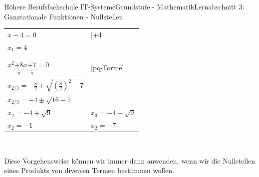 \documentclass[11pt,twocolumn,oneside,openany,headings=optiontotoc,11pt,numbers=noenddot]{article}
\begin{document}
\begin{worksheet}{Höhere Berufsfachschule IT-Systeme}{Grundstufe - Mathematik}{Lernabschnitt 3: Ganzrationale Funktionen - Nullstellen}
\begin{tabularx}{0.48\textwidth}{Xl}
			\(x-4 = 0\) & |+4\\
			\colorbox{green!10}{\(x_1 = 4\)} &\\
			\\
			\hline
			\\
			\(x^2\underbrace{+8}_{p}x \underbrace{+7}_{q} = 0\) & |pq-Formel\\
			\(x_{2/3}= -\frac{8}{2}\pm\sqrt{\left(\frac{8}{2}\right)^2-7}\)\\
			\(x_{2/3} = -4 \pm \sqrt{16-7}\)\\
			\(x_2 = -4 + \sqrt{9}\) & \(x_3 = -4 - \sqrt{9}\)\\
			\colorbox{green!10}{\(x_2 = -1\)} & \colorbox{green!10}{\(x_2 = -7\)}
		\end{tabularx}\\
		\par\noindent
		Diese Vorgehensweise können wir immer dann anwenden, wenn wir die Nullstellen eines Produkts von diversen Termen bestimmen wollen.

\end{worksheet}
\end{document}
